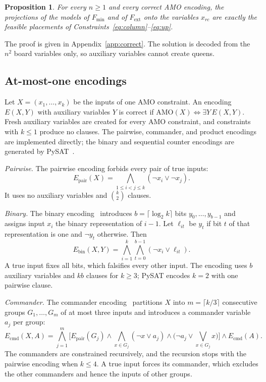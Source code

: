 \documentclass[a4paper,fleqn]{cas-sc}
\newtheorem{proposition}{Proposition}
\newcommand{\AMO}{\mathrm{AMO}}
\begin{document}
\begin{proposition}
\label{prop:correct}
For every $n\ge1$ and every correct AMO encoding, the projections of the
models of $F_{\min}$ and of $F_{\mathrm{ext}}$ onto the variables $x_{rc}$
are exactly the feasible placements of Constraints~\eqref{eq:column}--\eqref{eq:up}.
\end{proposition}
The proof is given in Appendix~\ref{app:correct}. The solution is decoded
from the $n^2$ board variables only, so auxiliary variables cannot create
queens.

\subsection{At-most-one encodings}
\label{sec:amo}
Let $X=(x_1,\ldots,x_k)$ be the inputs of one AMO constraint. An encoding
$E(X,Y)$ with auxiliary variables $Y$ is correct if
$\AMO(X)\Leftrightarrow\exists Y\,E(X,Y)$. Fresh auxiliary variables are
created for every AMO constraint, and constraints with $k\le1$ produce no
clauses. The pairwise, commander, and product encodings are implemented
directly; the binary and sequential counter encodings are generated by
PySAT~\cite{pysatcard}.

\textit{Pairwise.} The pairwise encoding forbids every pair of true inputs:
\begin{equation}
E_{\mathrm{pair}}(X)=\bigwedge_{1\le i<j\le k}(\neg x_i\vee\neg x_j).
\end{equation}
It uses no auxiliary variables and $\binom{k}{2}$ clauses.

\textit{Binary.} The binary encoding~\cite{frischbinary} introduces
$b=\lceil\log_2k\rceil$ bits $y_0,\ldots,y_{b-1}$ and assigns input $x_i$
the binary representation of $i-1$. Let $\ell_{it}$ be $y_t$ if bit $t$ of
that representation is one and $\neg y_t$ otherwise. Then
\begin{equation}
E_{\mathrm{bin}}(X,Y)=\bigwedge_{i=1}^{k}\bigwedge_{t=0}^{b-1}(\neg x_i\vee\ell_{it}).
\end{equation}
A true input fixes all bits, which falsifies every other input. The
encoding uses $b$ auxiliary variables and $kb$ clauses for $k\ge3$; PySAT
encodes $k=2$ with one pairwise clause.

\textit{Commander.} The commander encoding~\cite{commander} partitions $X$
into $m=\lceil k/3\rceil$ consecutive groups $G_1,\ldots,G_m$ of at most
three inputs and introduces a commander variable $a_j$ per group:
\begin{equation}
E_{\mathrm{cmd}}(X,A)=\bigwedge_{j=1}^m\Big[E_{\mathrm{pair}}(G_j)\wedge
\bigwedge_{x\in G_j}(\neg x\vee a_j)\wedge
\big(\neg a_j\vee\textstyle\bigvee_{x\in G_j}x\big)\Big]\wedge E_{\mathrm{cmd}}(A).
\end{equation}
The commanders are constrained recursively, and the recursion stops with
the pairwise encoding when $k\le4$. A true input forces its commander,
which excludes the other commanders and hence the inputs of other groups.
\end{document}
